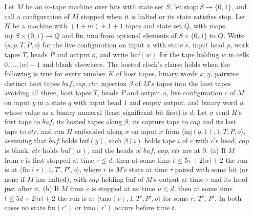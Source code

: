 \begin{definition}
\label{Turing.NTimeDiag.DzClockSpec}
\leanok
{}
Let $M$ be an $m$-tape machine over bits with state set $S$, let $\mathrm{stop} : S \to \{0, 1\}$,
and call a configuration of $M$ stopped when it is halted or its state satisfies $\mathrm{stop}$.
Let $H$ be a machine with $(1 + m) + 1 + 1$ tapes and state set $Q$, with maps $\mathrm{inj} : S
\times \{0, 1\} \to Q$ and $\mathrm{fin}, \mathrm{tmo}$ from optional elements of $S \times \{0,
1\}$ to $Q$. Write $\langle s, p, T, P, o\rangle$ for the live configuration on input $x$ with
state $s$, input head $p$, work tapes $T$, heads $P$ and output $o$, and write $\mathrm{buf}(w)$
for the tape holding $w$ in cells $0, \dots, |w| - 1$ and blank elsewhere. The hosted clock's
clause holds when the following is true for every number $K$ of host tapes, binary words $x, y$,
pairwise distinct host tapes $\mathit{buf}, \mathit{cap}, \mathit{ctr}$, injection $\beta$ of $M$'s
tapes into the host tapes avoiding all three, host tapes $T$, heads $P$ and output $o$, live
configuration $c$ of $M$ on input $y$ in a state $q$ with input head $1$ and empty output, and
binary word $w$ whose value as a binary numeral (least significant bit first) is $d$. Let $\sigma$
send $H$'s first tape to $\mathit{buf}$, its hosted tapes along $\beta$, its capture tape to
$\mathit{cap}$ and its last tape to $\mathit{ctr}$, and run $H$ embedded along $\sigma$ on input
$x$ from $\langle \mathrm{inj}(q, 1), 1, T, P, o\rangle$, assuming that $\mathit{buf}$ holds
$\mathrm{buf}(y)$, each $\beta(i)$ holds tape $i$ of $c$ with $c$'s head, $\mathit{cap}$ is blank,
$\mathit{ctr}$ holds $\mathrm{buf}(w)$, and the heads of $\mathit{buf}$, $\mathit{cap}$,
$\mathit{ctr}$ are at $0$. (a) If $M$ from $c$ is first stopped at time $\tau \le d$, then at some
time $t \le 5\tau + 2|w| + 2$ the run is at $\langle \mathrm{fin}(r), 1, T', P', o\rangle$, where
$r$ is $M$'s state at time $\tau$ paired with some bit (or none if $M$ has halted), with
$\mathit{cap}$ holding $\mathrm{buf}$ of $M$'s output at time $\tau$ and its head just after it.
(b) If $M$ from $c$ is stopped at no time $u \le d$, then at some time $t \le 5d + 2|w| + 2$ the
run is at $\langle \mathrm{tmo}(r), 1, T', P', o\rangle$ for some $r$, $T'$, $P'$. In both cases no
state $\mathrm{fin}(r')$ or $\mathrm{tmo}(r')$ occurs before time $t$.
\end{definition}

